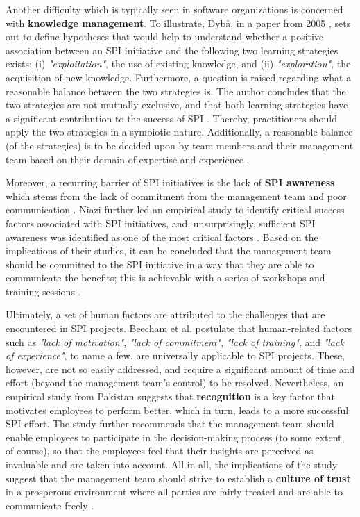 \documentclass[conference]{IEEEtran}
\begin{document}
Another difficulty which is typically seen in software organizations is
concerned with \textbf{knowledge management}. To illustrate, Dybå, in a paper
from 2005 \cite{Dyba2005}, sets out to define hypotheses that would help to
understand whether a positive association between an SPI initiative and the
following two learning strategies exists: (i) \textit{"exploitation"}, the use
of existing knowledge, and (ii) \textit{"exploration"}, the acquisition of new
knowledge. Furthermore, a question is raised regarding what a reasonable
balance between the two strategies is. The author concludes that the two
strategies are not mutually exclusive, and that both learning strategies have a
significant contribution to the success of SPI \cite{Dyba2005}. Thereby,
practitioners should apply the two strategies in a symbiotic nature.
Additionally, a reasonable balance (of the strategies) is to be decided upon by
team members and their management team based on their domain of expertise and
experience \cite{Dyba2005}.


Moreover, a recurring barrier of SPI initiatives is the lack of \textbf{SPI
awareness} which stems from the lack of commitment from the management team
and poor communication \cite{Niazi2010}. Niazi further led an empirical study 
to identify critical success factors associated with SPI initiatives, and,
unsurprisingly, sufficient SPI awareness was identified as one of the most
critical factors \cite{Niazi2006}. Based on the implications of their studies,
it can be concluded that the management team should be committed to the SPI
initiative in a way that they are able to communicate the benefits; this is
achievable with a series of workshops and training sessions \cite{Niazi2006}.

Ultimately, a set of human factors are attributed to the challenges that are
encountered in SPI projects. Beecham et al. \cite{Beecham2003}
postulate that human-related factors such as \textit{"lack of motivation"},
\textit{"lack of commitment"}, \textit{"lack of training"}, and \textit{"lack
of experience"}, to name a few, are universally applicable to SPI projects.
These, however, are not so easily addressed, and require a significant amount
of time and effort (beyond the management team's control) to be resolved.
Nevertheless, an empirical study from Pakistan \cite{Danish2010} suggests that
\textbf{recognition} is a key factor that motivates employees to perform better,
which in turn, leads to a more successful SPI effort. The study further
recommends that the management team should enable employees to participate in
the decision-making process (to some extent, of course), so that the employees
feel that their insights are perceived as invaluable and are taken into
account. All in all, the implications of the study suggest that the management
team should strive to establish a \textbf{culture of trust} in a prosperous
environment where all parties are fairly treated and are able to communicate
freely \cite{Danish2010}.
\end{document}
